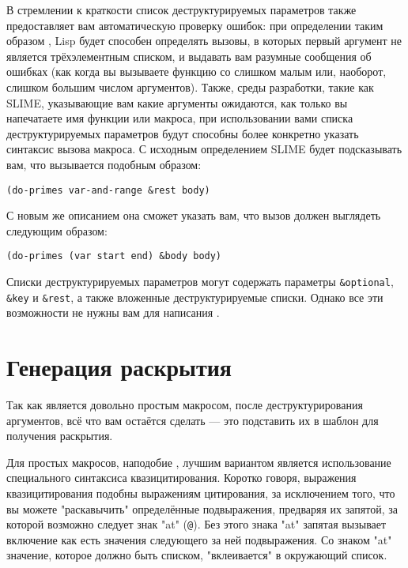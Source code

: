 В стремлении к краткости список деструктурируемых параметров также предоставляет вам
автоматическую проверку ошибок: при определении таким образом , Lisp будет
способен определять вызовы, в которых первый аргумент не является трёхэлементным списком,
и выдавать вам разумные сообщения об ошибках (как когда вы вызываете функцию со слишком
малым или, наоборот, слишком большим числом аргументов). Также, среды разработки, такие
как SLIME, указывающие вам какие аргументы ожидаются, как только вы напечатаете имя
функции или макроса, при использовании вами списка деструктурируемых параметров будут
способны более конкретно указать синтаксис вызова макроса. С исходным определением SLIME
будет подсказывать вам, что  вызывается подобным образом:

\begin{lstlisting}
(do-primes var-and-range &rest body)
\end{lstlisting}

С новым же описанием она сможет указать вам, что вызов должен выглядеть следующим образом:

\begin{lstlisting}
(do-primes (var start end) &body body)
\end{lstlisting}

Списки деструктурируемых параметров могут содержать параметры \lstinline!&optional!,
\lstinline!&key! и \lstinline!&rest!, а также вложенные деструктурируемые списки. Однако
все эти возможности не нужны вам для написания .

\section{Генерация раскрытия}

Так как  является довольно простым макросом, после деструктурирования
аргументов, всё что вам остаётся сделать --- это подставить их в шаблон для получения
раскрытия.

Для простых макросов, наподобие , лучшим вариантом является использование
специального синтаксиса квазицитирования. Коротко говоря, выражения квазицитирования
подобны выражениям цитирования, за исключением того, что вы можете "раскавычить"
определённые подвыражения, предваряя их запятой, за которой возможно следует знак "at"
(\lstinline!@!). Без этого знака "at" запятая вызывает включение как есть значения
следующего за ней подвыражения. Со знаком "at" значение, которое должно быть списком,
"вклеивается" в окружающий список.

